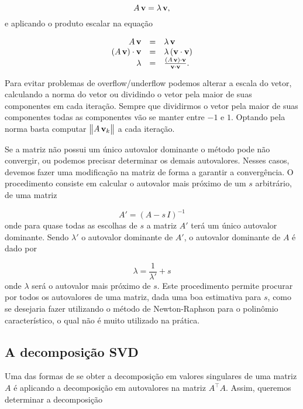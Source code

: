 \begin{equation*}
A\,{\bf v}=\lambda\,{\bf v},
\end{equation*}
e aplicando o produto escalar na equação

\begin{equation*}
\begin{array}{rcl}
A\,{\bf v}&=&\lambda\,{\bf v}\\
(A\,{\bf v})\cdot{\bf v}&=&\lambda\,({\bf v}\cdot{\bf v})\\
\lambda&=&\frac{(A\,{\bf v})\cdot{\bf v}}{{\bf v}\cdot{\bf v}}.
\end{array}
\end{equation*}

Para evitar problemas de overflow/underflow podemos alterar a escala do vetor, calculando a norma do vetor ou dividindo o vetor pela maior de suas componentes em cada iteração. Sempre que dividirmos o vetor pela maior de suas componentes todas as componentes vão se manter entre $-1$ e $1$. Optando pela norma basta computar $\begin{Vmatrix}A\,{\bf v}_k\end{Vmatrix}$ a cada iteração. 


Se a matriz não possui um único autovalor dominante o método pode não convergir, ou podemos precisar determinar os demais autovalores. Nesses casos, devemos fazer uma modificação na matriz de forma a garantir a convergência. O procedimento consiste em calcular o autovalor mais próximo de um $s$ arbitrário, de uma matriz

\begin{equation*}
A'=(A-s\,I)^{-1}
\end{equation*}
onde para quase todas as escolhas de $s$ a matriz $A'$ terá um único autovalor dominante. Sendo $\lambda'$ o autovalor dominante de $A'$, o autovalor dominante de $A$ é dado por

\begin{equation*}
\lambda=\frac{1}{\lambda'}+s
\end{equation*} 
onde $\lambda$ será o autovalor mais próximo de $s$. Este procedimento permite procurar por todos os autovalores de uma matriz, dada uma boa estimativa para $s$, como se desejaria fazer utilizando o método de Newton-Raphson para o polinômio característico, o qual não é muito utilizado na prática.

\subsection*{A decomposição SVD}
Uma das formas de se obter a decomposição em valores singulares de uma matriz $A$ é aplicando a decomposição em autovalores na matriz  $A^\top A$. Assim, queremos determinar a decomposição

